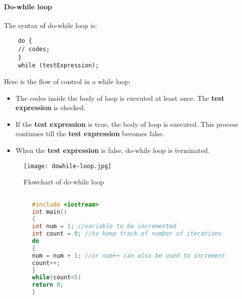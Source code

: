 \documentclass[11pt,fleqn]{book} %
\begin{document}
	\paragraph{Do-while loop}
	The syntax of do-while loop is:
	\begin{lstlisting}
	do {
	// codes;
	}
	while (testExpression);
	\end{lstlisting}
	Here is the flow of control in a while loop:
	\begin{itemize}
		\item The codes inside the body of loop is executed at least once. The \textbf{test expression} is checked.
		\item If the \textbf{test expression} is true, the body of loop is executed. This process continues till the \textbf{test expression} becomes false.
		\item When the \textbf{test expression} is false, do-while loop is terminated.
	\end{itemize}
	\begin{figure}[H]
		\centering
		\texttt{[image: dowhile-loop.jpg]}
		\caption{Flowchart of do-while loop}
	\end{figure}
	\begin{example}
		\begin{lstlisting}[language=C++, caption = Using Do-While loop to increment an integer 5 times]
		
		#include <iostream>
		int main()
		{
		int num = 1; //variable to be incremented
		int count = 0; //to keep track of number of iterations
		do
		{
		num = num + 1; //or num++ can also be used to increment
		count++;
		}
		while(count<5)
		return 0;
		}
		\end{lstlisting}
	\end{example}
\end{document}
